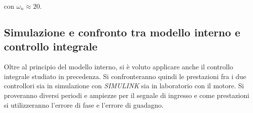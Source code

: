 	\noindent con $\omega_n \approx 20$. 
	
	\subsection{Simulazione e confronto tra modello interno e controllo integrale}
	\label{subsec:SimInterno}
	
	Oltre al principio del modello interno, si è voluto applicare anche il controllo integrale studiato in precedenza. Si confronteranno quindi le prestazioni fra i due controllori sia in simulazione con \textit{SIMULINK} sia in laboratorio con il motore. Si proveranno diversi periodi e ampiezze per il segnale di ingresso e come prestazioni si utilizzeranno l'errore di fase e l'errore di guadagno.
	
	
	
	
	
	
	